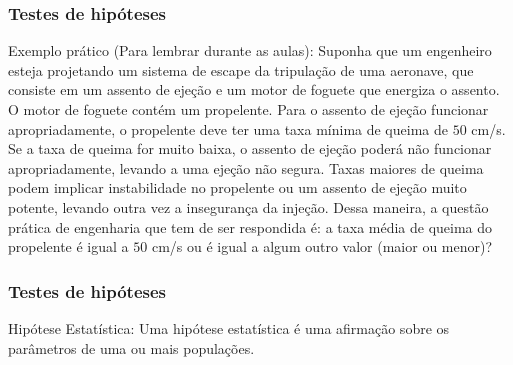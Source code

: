 \documentclass[14pt,aspectratio=1610]{beamer}
\begin{document}
\begin{frame}{}
\frametitle{Testes de hipóteses}
\begin{block}{Exemplo prático (Para lembrar durante as aulas):}
\justifying
Suponha que um engenheiro esteja projetando um sistema de escape da tripulação de uma aeronave, que consiste em um assento de ejeção e um motor de foguete 
que energiza o assento. O motor de foguete contém um propelente. Para o assento de ejeção funcionar apropriadamente, o propelente deve ter uma taxa mínima de 
queima de $50$ cm/s. Se a taxa de queima for muito baixa, o assento de ejeção poderá não funcionar apropriadamente, levando a uma ejeção não segura. Taxas maiores 
de queima podem implicar instabilidade no propelente ou um assento de ejeção muito potente, levando outra vez a insegurança da injeção. Dessa maneira, a questão 
prática de engenharia que tem de ser respondida é: a taxa média de queima do propelente é igual a $50$ cm/s ou é igual a algum outro valor 
(maior ou menor)?
\end{block}
\end{frame}

\begin{frame}{}
\frametitle{Testes de hipóteses}
\begin{block}{Hipótese Estatística:}
Uma hipótese estatística é uma afirmação sobre os parâmetros de uma ou mais populações.
 \end{block}
\end{frame}
\end{document}

